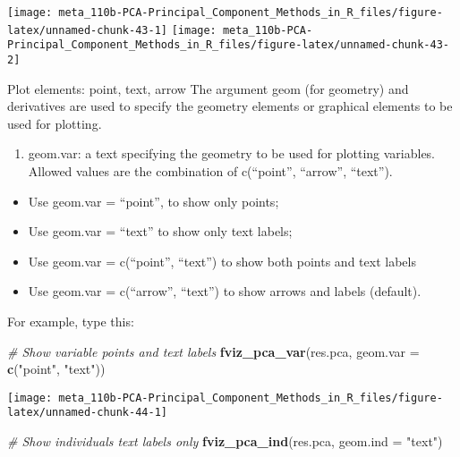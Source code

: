 \documentclass[]{book}
\newenvironment{Shaded}{\begin{snugshade}}{\end{snugshade}}
\newcommand{\CommentTok}[1]{\textcolor[rgb]{0.56,0.35,0.01}{\textit{#1}}}
\newcommand{\DataTypeTok}[1]{\textcolor[rgb]{0.13,0.29,0.53}{#1}}
\newcommand{\KeywordTok}[1]{\textcolor[rgb]{0.13,0.29,0.53}{\textbf{#1}}}
\newcommand{\NormalTok}[1]{#1}
\newcommand{\StringTok}[1]{\textcolor[rgb]{0.31,0.60,0.02}{#1}}
\providecommand{\tightlist}{%
  \setlength{\itemsep}{0pt}\setlength{\parskip}{0pt}}
\begin{document}
\begin{center}\texttt{[image: meta\_110b-PCA-Principal\_Component\_Methods\_in\_R\_files/figure-latex/unnamed-chunk-43-1]} \texttt{[image: meta\_110b-PCA-Principal\_Component\_Methods\_in\_R\_files/figure-latex/unnamed-chunk-43-2]} \end{center}

Plot elements: point, text, arrow
The argument geom (for geometry) and derivatives are used to specify the geometry elements or graphical elements to be used for plotting.

\begin{enumerate}
\def\labelenumi{\arabic{enumi}.}
\tightlist
\item
  geom.var: a text specifying the geometry to be used for plotting variables. Allowed values are the combination of c(``point'', ``arrow'', ``text'').
\end{enumerate}

\begin{itemize}
\tightlist
\item
  Use geom.var = ``point'', to show only points;
\item
  Use geom.var = ``text'' to show only text labels;
\item
  Use geom.var = c(``point'', ``text'') to show both points and text labels
\item
  Use geom.var = c(``arrow'', ``text'') to show arrows and labels (default).
\end{itemize}

For example, type this:

\begin{Shaded}
\begin{Highlighting}[]
\CommentTok{# Show variable points and text labels}
\KeywordTok{fviz_pca_var}\NormalTok{(res.pca, }\DataTypeTok{geom.var =} \KeywordTok{c}\NormalTok{(}\StringTok{"point"}\NormalTok{, }\StringTok{"text"}\NormalTok{))}
\end{Highlighting}
\end{Shaded}

\begin{center}\texttt{[image: meta\_110b-PCA-Principal\_Component\_Methods\_in\_R\_files/figure-latex/unnamed-chunk-44-1]} \end{center}

\begin{Shaded}
\begin{Highlighting}[]
\CommentTok{# Show individuals text labels only}
\KeywordTok{fviz_pca_ind}\NormalTok{(res.pca, }\DataTypeTok{geom.ind =}  \StringTok{"text"}\NormalTok{)}
\end{Highlighting}
\end{Shaded}
\end{document}
